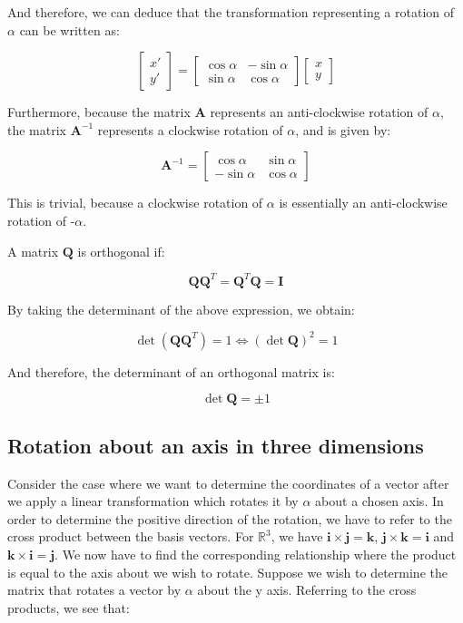 \documentclass[12pt]{article}
\begin{document}
And therefore, we can deduce that the transformation representing a rotation of $\alpha$ can be written as:

\[ \begin{bmatrix}
    x' \\
    y'
\end{bmatrix} = \begin{bmatrix}
    \cos{\alpha} & -\sin{\alpha} \\
    \sin{\alpha} & \cos{\alpha}
\end{bmatrix} \begin{bmatrix}
    x \\
    y
\end{bmatrix} \]

Furthermore, because the matrix $\mathbf{A}$ represents an anti-clockwise rotation of $\alpha$, the matrix $\mathbf{A}^{-1}$ represents a clockwise rotation of $\alpha$, and is given by:

\[ \mathbf{A}^{-1} = \begin{bmatrix}
    \cos{\alpha} & \sin{\alpha} \\
    -\sin{\alpha} & \cos{\alpha}
\end{bmatrix} \]

This is trivial, because a clockwise rotation of $\alpha$ is essentially an anti-clockwise rotation of -$\alpha$.

\begin{definition}
    A matrix $\mathbf{Q}$ is orthogonal if:

    \[ \mathbf{Q}\mathbf{Q}^T = \mathbf{Q}^T\mathbf{Q} = \mathbf{I} \]

    By taking the determinant of the above expression, we obtain:

    \[ \det{\left(\mathbf{Q}\mathbf{Q}^T\right)} = 1 \iff (\det{\mathbf{Q}})^2 = 1 \]

    And therefore, the determinant of an orthogonal matrix is:

    \[ \det{\mathbf{Q}} = \pm 1 \]
\end{definition}

\newpage

\subsection{Rotation about an axis in three dimensions}

Consider the case where we want to determine the coordinates of a vector after we apply a linear transformation which rotates it by $\alpha$ about a chosen axis. In order to determine the positive direction of the rotation, we have to refer to the cross product between the basis vectors. For $\mathbb{R}^3$, we have $\mathbf{i \times j = k}$, $\mathbf{j \times k = i}$ and $\mathbf{k \times i = j}$. We now have to find the corresponding relationship where the product is equal to the axis about we wish to rotate.
Suppose we wish to determine the matrix that rotates a vector by $\alpha$ about the y axis. Referring to the cross products, we see that:
\end{document}
